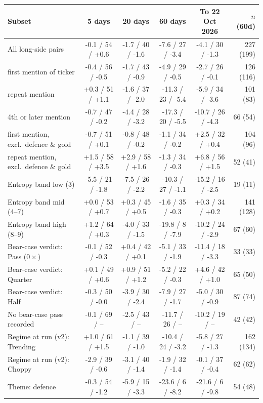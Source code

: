 \begin{tabular}{lccccr}
\toprule
Subset & 5 days & 20 days & 60 days & To 22 Oct 2026 & $n$ (60d) \\
\midrule
All long-side pairs & -0.1 / 54 / +0.6 & -1.7 / 40 / -1.6 & -7.6 / 27 / -3.4 & -4.1 / 30 / -1.3 & 227 (199) \\
\quad first mention of ticker & -0.4 / 56 / -0.5 & -1.7 / 43 / -0.9 & -4.9 / 29 / -0.5 & -2.7 / 26 / -0.1 & 126 (116) \\
\quad repeat mention & +0.3 / 51 / +1.1 & -1.6 / 37 / -2.0 & -11.3 / 23 / -5.4 & -5.9 / 34 / -3.6 & 101 (83) \\
\quad 4th or later mention & -0.7 / 47 / -0.2 & -4.4 / 28 / -3.2 & -17.3 / 20 / -5.5 & -10.7 / 26 / -4.3 & 66 (54) \\
\quad first mention, excl.\ defence \& gold & -0.7 / 51 / +0.1 & -0.8 / 48 / -0.2 & -1.1 / 34 / -0.2 & +2.5 / 32 / +0.4 & 104 (96) \\
\quad repeat mention, excl.\ defence \& gold & +1.5 / 58 / +3.5 & +2.9 / 58 / +1.6 & -1.3 / 34 / -0.3 & +6.8 / 56 / +1.5 & 52 (41) \\
Entropy band low (3) & -5.5 / 21 / -1.8 & -7.5 / 26 / -2.2 & -10.3 / 27 / -1.1 & -15.2 / 16 / -2.5 & 19 (11) \\
Entropy band mid (4--7) & +0.0 / 53 / +0.7 & +0.3 / 45 / +0.5 & -1.6 / 35 / -0.3 & +0.3 / 34 / +0.2 & 141 (128) \\
Entropy band high (8--9) & +1.2 / 64 / +0.3 & -4.0 / 33 / -1.5 & -19.8 / 8 / -7.9 & -10.2 / 24 / -2.9 & 67 (60) \\
Bear-case verdict: Pass ($0\times$) & -0.1 / 52 / -0.3 & +0.4 / 42 / +0.1 & -5.1 / 33 / -1.9 & -11.4 / 18 / -3.3 & 33 (33) \\
Bear-case verdict: Quarter & +0.1 / 49 / +0.6 & +0.9 / 51 / +1.2 & -5.2 / 22 / -0.3 & +4.6 / 42 / +1.0 & 65 (50) \\
Bear-case verdict: Half & -0.3 / 50 / -0.0 & -3.9 / 30 / -2.4 & -7.9 / 27 / -1.7 & -5.0 / 30 / -0.9 & 87 (74) \\
No bear-case pass recorded & -0.1 / 69 / -- & -2.5 / 43 / -- & -11.7 / 26 / -- & -10.2 / 19 / -- & 42 (42) \\
Regime at run (v2): Trending & +1.0 / 61 / +1.5 & -1.1 / 39 / -1.0 & -10.4 / 24 / -3.2 & -5.8 / 27 / -1.3 & 162 (134) \\
Regime at run (v2): Choppy & -2.9 / 39 / -0.6 & -3.1 / 40 / -1.4 & -1.9 / 32 / -1.4 & -0.1 / 37 / -0.4 & 62 (62) \\
Theme: defence & -0.3 / 54 / -1.2 & -5.9 / 15 / -3.3 & -23.6 / 6 / -8.2 & -21.6 / 6 / -9.8 & 54 (48) \\

\end{tabular}
